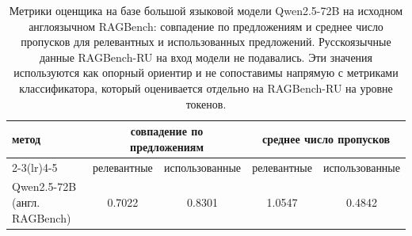 \begin{table}[H]
\centering
\caption{Метрики оценщика на базе большой языковой модели Qwen2.5-72B на исходном англоязычном RAGBench: совпадение по предложениям и среднее число пропусков для релевантных и использованных предложений. Русскоязычные данные RAGBench-RU на вход модели не подавались. Эти значения используются как опорный ориентир и не сопоставимы напрямую с метриками классификатора, который оценивается отдельно на RAGBench-RU на уровне токенов.}
\label{tab:classifier_vs_llm}
\small
\setlength{\tabcolsep}{6pt}
\begin{tabular}{lcccc}
\toprule
\multirow{2}{*}{метод} & \multicolumn{2}{c}{совпадение по предложениям} & \multicolumn{2}{c}{среднее число пропусков} \\
\cmidrule(lr){2-3}\cmidrule(lr){4-5}
 & релевантные & использованные & релевантные & использованные \\
\midrule
Qwen2.5-72B (англ. RAGBench) & 0.7022 & 0.8301 & 1.0547 & 0.4842 \\
\bottomrule
\end{tabular}
\end{table}
